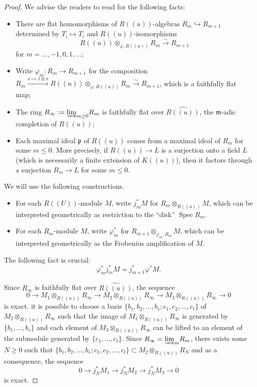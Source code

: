 \documentclass[11pt]{amsart}
\numberwithin{thm}{section}
\numberwithin{lem}{section}
\numberwithin{cor}{section}
\numberwithin{prop}{section}
\numberwithin{exam}{section}
\numberwithin{dfn}{section}
\newcommand{\spec}{\operatorname{Spec}}
\newcommand{\dirlim}[1]{{\varinjlim_{#1}}}
\newcommand{\fm}{\mathfrak{m}}
\newcommand{\fp}{\mathfrak{p}}
\begin{document}
\begin{appendices}
\begin{proof}
We advise the readers to read \cite[5.5.20]{EG21} for
the following facts:
\begin{itemize}
\item[(i)]
There are flat homomorphisms of $R(\!(u)\!)$-algebras
$R_m \hookrightarrow R_{m+1}$ determined by $T_i\mapsto T_i$ 
and $R(\!(u)\!)$-isomorphisms
$$
R(\!(u)\!)\otimes_{\varphi,R(\!(u)\!)}R_m\xrightarrow{\sim} R_{m+1}
$$
for $m = \dots,-1,0,1,\dots$;
\item[(ii)]
Write $\varphi_m: R_m\to R_{m+1}$ for the composition
$R_m\xrightarrow{x\mapsto 1\otimes x}R(\!(u)\!)\otimes_{\varphi,R(\!(u)\!)}R_m\xrightarrow{\sim} R_{m+1}$,
which is a faithfully flat map;
\item[(iii)]
The ring $R_{\infty}:=\dirlim{m\ge 0}R_m$ is faithfully flat over 
$\widehat{R(\!(u)\!)}$, the $\fm$-adic completion of $R(\!(u)\!)$;
\item[(iv)]
Each maximal ideal $\fp$ of $R(\!(u)\!)$ comes from
a maximal ideal of $R_{m}$ for some $m\le 0$.
More precisely, if $R(\!(u)\!)\to L$ is a surjection
onto a field $L$ (which is necessarily a finite extension of $K(\!(u)\!)$),
then it factors through a surjection $R_m\to L$ for some $m\le 0$.
\end{itemize}

We will use the following constructions.

\begin{itemize}
\item[(I)] For each $R((U))$-module $M$, write $j_m^*M$ for $R_m\otimes_{R(\!(u)\!)}M$, which can be interpreted geometrically as restriction to the ``disk'' $\spec R_m$.
\item[(II)] For each $R_m$-module $M$, write $\varphi_m^*$ for
$R_{m+1}\otimes_{\varphi_m, R_m}M$,
which can be interpreted geometrically as the Frobenius amplification of $M$.
\end{itemize}
The following fact is crucial:
$$\varphi_m^*j_m^*M = j_{m+1}^*\varphi^*M.$$

Since $R_{\infty}$ is faithfully flat over $\widehat{R(\!(u)\!)}$,
the sequence
$$0\to M_1\otimes_{R(\!(u)\!)} R_{\infty}
\to M_2\otimes_{R(\!(u)\!)} R_{\infty}
\to M_3\otimes_{R(\!(u)\!)} R_{\infty}\to 0$$
is exact.
it is possible to choose a basis $\{b_1,b_2,\dots,b_s;c_1,c_2,\dots,c_t\}$
of $M_2\otimes_{R(\!(u)\!)}R_{\infty}$ such that 
the image of $M_1\otimes_{R(\!(u)\!)} R_{\infty}$ is generated by $\{b_1,\dots,b_s\}$
and each element of $M_3\otimes_{R(\!(u)\!)}R_{\infty}$
can be lifted to an element of the submodule generated by $\{c_1,\dots,c_t\}$.
Since $R_{\infty} = \dirlim{m}R_m$,
there exists some $N\ge 0$ such that
$\{b_1,b_2,\dots,b_s;c_1,c_2,\dots,c_t\}\subset M_2\otimes_{R(\!(u)\!)}R_N$
and as a consequence,
the sequence
$$0\to j_N^*M_1
\to j_N^*M_2
\to j_N^*M_3\to 0$$
is exact.


\end{proof}
\end{appendices}
\end{document}
